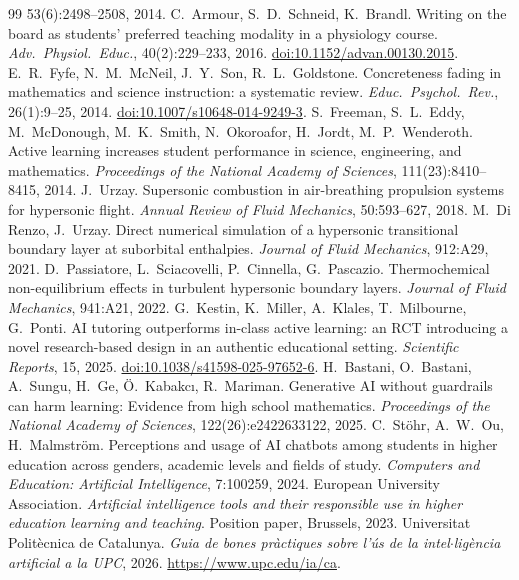 \documentclass[11pt]{article}
\begin{document}
\begin{thebibliography}{99}
53(6):2498--2508, 2014.
 C.\ Armour, S.\ D.\ Schneid, K.\ Brandl. Writing on the board as students' preferred teaching modality in a physiology course. \emph{Adv.\ Physiol.\ Educ.}, 40(2):229--233, 2016. \href{https://doi.org/10.1152/advan.00130.2015}{doi:10.1152/advan.00130.2015}.
 E.\ R.\ Fyfe, N.\ M.\ McNeil, J.\ Y.\ Son, R.\ L.\ Goldstone. Concreteness fading in mathematics and science instruction: a systematic review. \emph{Educ.\ Psychol.\ Rev.}, 26(1):9--25, 2014. \href{https://doi.org/10.1007/s10648-014-9249-3}{doi:10.1007/s10648-014-9249-3}.
 S.\ Freeman, S.\ L.\ Eddy, M.\ McDonough, M.\ K.\ Smith, N.\ Okoroafor,
H.\ Jordt, M.\ P.\ Wenderoth. Active learning increases student performance in science,
engineering, and mathematics. \emph{Proceedings of the National Academy of Sciences},
111(23):8410--8415, 2014.
 J.\ Urzay. Supersonic combustion in air-breathing propulsion systems for
hypersonic flight. \emph{Annual Review of Fluid Mechanics}, 50:593--627, 2018.
 M.\ Di Renzo, J.\ Urzay. Direct numerical simulation of a
hypersonic transitional boundary layer at suborbital enthalpies. \emph{Journal of Fluid
Mechanics}, 912:A29, 2021.
 D.\ Passiatore, L.\ Sciacovelli, P.\ Cinnella, G.\ Pascazio.
Thermochemical non-equilibrium effects in turbulent hypersonic boundary layers.
\emph{Journal of Fluid Mechanics}, 941:A21, 2022.
 G.\ Kestin, K.\ Miller, A.\ Klales, T.\ Milbourne, G.\ Ponti. AI tutoring
outperforms in-class active learning: an RCT introducing a novel research-based design in an
authentic educational setting. \emph{Scientific Reports}, 15, 2025.
\href{https://doi.org/10.1038/s41598-025-97652-6}{doi:10.1038/s41598-025-97652-6}.
 H.\ Bastani, O.\ Bastani, A.\ Sungu, H.\ Ge, \"O.\ Kabakc\i{}, R.\
Mariman. Generative AI without guardrails can harm learning: Evidence from high school
mathematics. \emph{Proceedings of the National Academy of Sciences}, 122(26):e2422633122,
2025.
 C.\ St\"ohr, A.\ W.\ Ou, H.\ Malmstr\"om. Perceptions and usage of AI
chatbots among students in higher education across genders, academic levels and fields of
study. \emph{Computers and Education: Artificial Intelligence}, 7:100259, 2024.
\bibitem{EUA2023} European University Association. \emph{Artificial intelligence tools and
their responsible use in higher education learning and teaching}. Position paper,
Brussels, 2023.
 Universitat Polit\`ecnica de Catalunya. \emph{Guia de bones pr\`actiques
sobre l'\'us de la intel$\cdot$lig\`encia artificial a la UPC}, 2026.
\url{https://www.upc.edu/ia/ca}.


\end{thebibliography}
\end{document}
